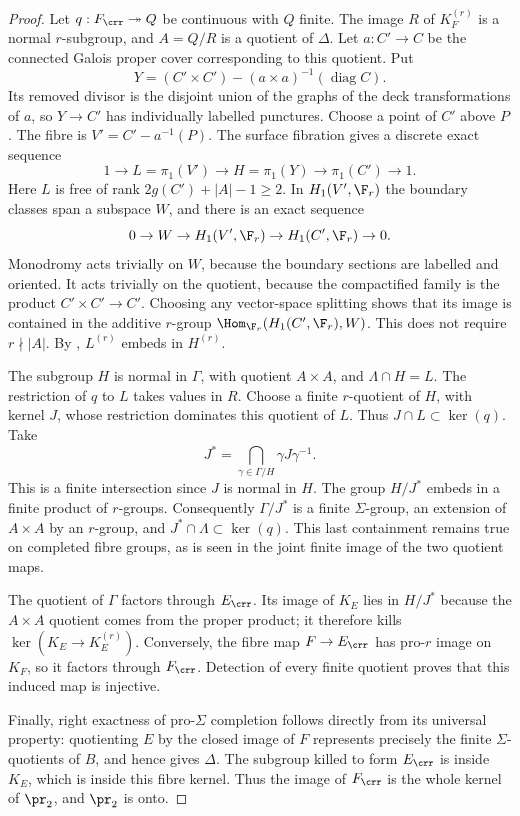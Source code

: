 \begin{proof}
Let $q:F_{\crr}\twoheadrightarrow Q$ be continuous with $Q$ finite.
The image $R$ of $K_F^{(r)}$ is a normal $r$-subgroup, and
$A=Q/R$ is a quotient of $\Delta$. Let $a:C'\to C$ be the connected
Galois proper cover corresponding to this quotient. Put
\[
 Y=(C'\times C')-(a\times a)^{-1}(\operatorname{diag} C).
\]
Its removed divisor is the disjoint union of the graphs of the deck
transformations of $a$, so $Y\to C'$ has individually labelled
punctures. Choose a point of $C'$ above $P$. The fibre is
$V'=C'-a^{-1}(P)$. The surface fibration gives a discrete exact sequence
\[
 1\to L=\pi_1(V')\to H=\pi_1(Y)\to\pi_1(C')\to1.
\]
Here $L$ is free of rank $2g(C')+|A|-1\geq2$. In
$H_1(V',\F_r)$ the boundary classes span a subspace $W$, and there is
an exact sequence
\[
 0\to W\to H_1(V',\F_r)\to H_1(C',\F_r)\to0.
\]
Monodromy acts trivially on $W$, because the boundary sections are
labelled and oriented. It acts trivially on the quotient, because the
compactified family is the product $C'\times C'\to C'$. Choosing any
vector-space splitting shows that its image is contained in the additive
$r$-group $\Hom_{\F_r}(H_1(C',\F_r),W)$. This does not require
$r\nmid|A|$. By , $L^{(r)}$ embeds in $H^{(r)}$.

The subgroup $H$ is normal in $\Gamma$, with quotient $A\times A$,
and $\Lambda\cap H=L$. The restriction of $q$ to $L$ takes values in
$R$. Choose a finite $r$-quotient of $H$, with kernel $J$, whose
restriction dominates this quotient of $L$. Thus
$J\cap L\subset\ker(q)$. Take
\[
 J^*=\bigcap_{\gamma\in\Gamma/H}\gamma J\gamma^{-1}.
\]
This is a finite intersection since $J$ is normal in $H$. The group
$H/J^*$ embeds in a finite product of $r$-groups. Consequently
$\Gamma/J^*$ is a finite $\Sigma$-group, an extension of $A\times A$
by an $r$-group, and $J^*\cap\Lambda\subset\ker(q)$. This last
containment remains true on completed fibre groups, as is seen in the
joint finite image of the two quotient maps.

The quotient of $\Gamma$ factors through $E_{\crr}$. Its image of
$K_E$ lies in $H/J^*$ because the $A\times A$ quotient comes from
the proper product; it therefore kills $\ker(K_E\to K_E^{(r)})$.
Conversely, the fibre map $F\to E_{\crr}$ has pro-$r$ image on
$K_F$, so it factors through $F_{\crr}$. Detection of every finite
quotient proves that this induced map is injective.

Finally, right exactness of pro-$\Sigma$ completion follows directly
from its universal property: quotienting $E$ by the closed image of
$F$ represents precisely the finite $\Sigma$-quotients of $B$, and
hence gives $\Delta$. The subgroup killed to form $E_{\crr}$ is
inside $K_E$, which is inside this fibre kernel. Thus the image of
$F_{\crr}$ is the whole kernel of $\pr_2$, and $\pr_2$ is onto.
\end{proof}

